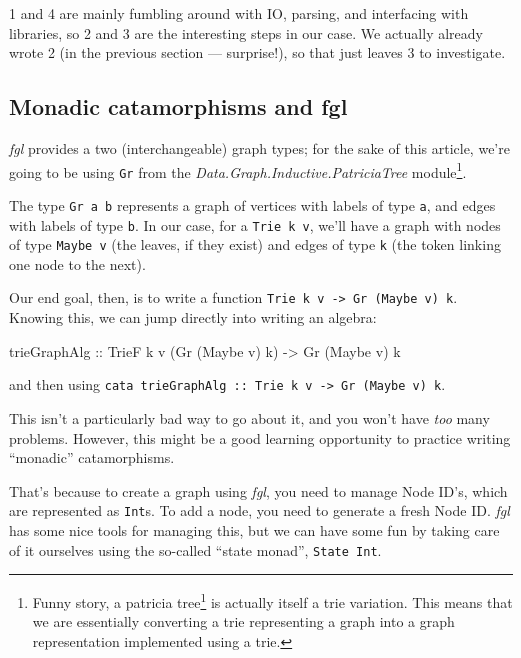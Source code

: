 \documentclass[]{article}
\newenvironment{Shaded}{}{}
\newcommand{\DataTypeTok}[1]{\textcolor[rgb]{0.56,0.13,0.00}{#1}}
\newcommand{\NormalTok}[1]{#1}
\newcommand{\OtherTok}[1]{\textcolor[rgb]{0.00,0.44,0.13}{#1}}
\renewcommand{\href}[2]{#2\footnote{\url{#1}}}
\begin{document}
1 and 4 are mainly fumbling around with IO, parsing, and interfacing with
libraries, so 2 and 3 are the interesting steps in our case. We actually already
wrote 2 (in the previous section --- surprise!), so that just leaves 3 to
investigate.

\hypertarget{monadic-catamorphisms-and-fgl}{%
\subsection{Monadic catamorphisms and fgl}\label{monadic-catamorphisms-and-fgl}}

\emph{fgl} provides a two (interchangeable) graph types; for the sake of this
article, we're going to be using \texttt{Gr} from the
\emph{Data.Graph.Inductive.PatriciaTree} module\footnote{Funny story, a
  \href{http://www.drdobbs.com/architecture-and-design/patricia-tries/208800854}{patricia
  tree} is actually itself a trie variation. This means that we are essentially
  converting a trie representing a graph into a graph representation implemented
  using a trie.}.

The type \texttt{Gr\ a\ b} represents a graph of vertices with labels of type
\texttt{a}, and edges with labels of type \texttt{b}. In our case, for a
\texttt{Trie\ k\ v}, we'll have a graph with nodes of type \texttt{Maybe\ v}
(the leaves, if they exist) and edges of type \texttt{k} (the token linking one
node to the next).

Our end goal, then, is to write a function
\texttt{Trie\ k\ v\ -\textgreater{}\ Gr\ (Maybe\ v)\ k}. Knowing this, we can
jump directly into writing an algebra:

\begin{Shaded}
\begin{Highlighting}[]
\NormalTok{trieGraphAlg}
\OtherTok{    ::} \DataTypeTok{TrieF}\NormalTok{ k v (}\DataTypeTok{Gr}\NormalTok{ (}\DataTypeTok{Maybe}\NormalTok{ v) k)}
    \OtherTok{->} \DataTypeTok{Gr}\NormalTok{ (}\DataTypeTok{Maybe}\NormalTok{ v) k}
\end{Highlighting}
\end{Shaded}

and then using
\texttt{cata\ trieGraphAlg\ ::\ Trie\ k\ v\ -\textgreater{}\ Gr\ (Maybe\ v)\ k}.

This isn't a particularly bad way to go about it, and you won't have \emph{too}
many problems. However, this might be a good learning opportunity to practice
writing ``monadic'' catamorphisms.

That's because to create a graph using \emph{fgl}, you need to manage Node ID's,
which are represented as \texttt{Int}s. To add a node, you need to generate a
fresh Node ID. \emph{fgl} has some nice tools for managing this, but we can have
some fun by taking care of it ourselves using the so-called ``state monad'',
\texttt{State\ Int}.
\end{document}
